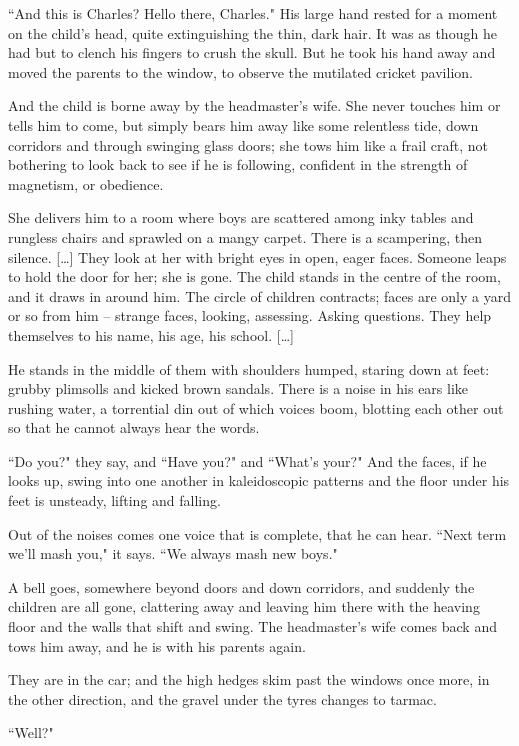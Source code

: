 \documentclass[10pt,a4paper]{article}
\newcommand{\qm}[1]{``#1"}
\begin{document}
\qm{And this is Charles? Hello there, Charles.} His large hand rested for a moment on the child's head, quite extinguishing the thin, dark hair. It was as though he had but to clench his fingers to crush the skull. But he took his hand away and moved the parents to the window, to observe the mutilated cricket pavilion.

And the child is borne away by the headmaster's wife. She never touches him or tells him to come, but simply bears him away like some relentless tide, down corridors and through swinging glass doors; she tows him like a frail craft, not bothering to look back to see if he is following, confident in the strength of magnetism, or obedience.

She delivers him to a room where boys are scattered among inky tables and rungless chairs and sprawled on a mangy carpet. There is a scampering, then silence. [\ldots] They look at her with bright eyes in open, eager faces. Someone leaps to hold the door for her; she is gone. The child stands in the centre of the room, and it draws in around him. The circle of children contracts; faces are only a yard or so from him -- strange faces, looking, assessing. Asking questions. They help themselves to his name, his age, his school. [\ldots]

He stands in the middle of them with shoulders humped, staring down at feet: grubby plimsolls and kicked brown sandals. There is a noise in his ears like rushing water, a torrential din out of which voices boom, blotting each other out so that he cannot always hear the words.

\qm{Do you?} they say, and \qm{Have you?} and \qm{What's your?} And the faces, if he looks up, swing into one another in kaleidoscopic patterns and the floor under his feet is unsteady, lifting and falling.

Out of the noises comes one voice that is complete, that he can hear. \qm{Next term we'll mash you,} it says. \qm{We always mash new boys.}

A bell goes, somewhere beyond doors and down corridors, and suddenly the children are all gone, clattering away and leaving him there with the heaving floor and the walls that shift and swing. The headmaster's wife comes back and tows him away, and he is with his parents again.

They are in the car; and the high hedges skim past the windows once more, in the other direction, and the gravel under the tyres changes to tarmac.

\qm{Well?}
\end{document}
